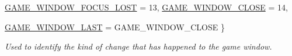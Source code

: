 \begin{DoxyCompactItemize}
\hyperlink{classMezzanine_1_1EventGameWindow_a0f0ff29853317334f018bcf48d502af2a4cef8ef4f7b17addaab216f86ea5820d}{GAME\_\-WINDOW\_\-FOCUS\_\-LOST} =  13, 
\hyperlink{classMezzanine_1_1EventGameWindow_a0f0ff29853317334f018bcf48d502af2a5632bb10b9d79cb918fe89971f22895b}{GAME\_\-WINDOW\_\-CLOSE} =  14, 
\par
\hyperlink{classMezzanine_1_1EventGameWindow_a0f0ff29853317334f018bcf48d502af2a2a8bc5ca735165737b84b8088463f3a7}{GAME\_\-WINDOW\_\-LAST} =  GAME\_\-WINDOW\_\-CLOSE
 \}
\begin{DoxyCompactList}\small\item\em Used to identify the kind of change that has happened to the game window. \item\end{DoxyCompactList}\end{DoxyCompactItemize}
